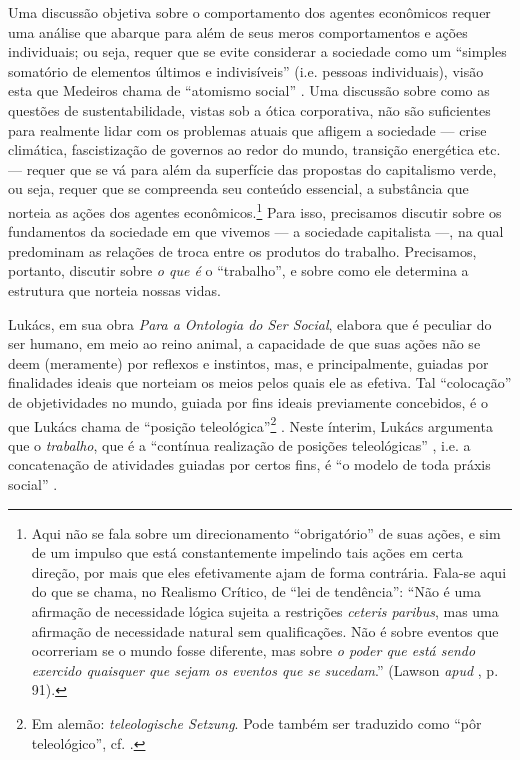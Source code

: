 \documentclass[12pt]{article}
\numberwithin{equation}{section}
\theoremstyle{plain}
\theoremstyle{definition}
\theoremstyle{remark}
\begin{document}
Uma discussão objetiva sobre o comportamento dos agentes econômicos requer uma análise que abarque para além de seus meros comportamentos e ações individuais; ou seja, requer que se evite considerar a sociedade como um ``simples somatório de elementos últimos e indivisíveis'' (i.e. pessoas individuais), visão esta que Medeiros chama de ``atomismo social'' \parencite[p. 56]{Medeiros2013}. Uma discussão sobre como as questões de sustentabilidade, vistas sob a ótica corporativa, não são suficientes para realmente lidar com os problemas atuais que afligem a sociedade --- crise climática, fascistização de governos ao redor do mundo, transição energética etc. --- requer que se vá para além da superfície das propostas do capitalismo verde, ou seja, requer que se compreenda seu conteúdo essencial, a substância que norteia as ações dos agentes econômicos.\footnote{Aqui não se fala sobre um direcionamento ``obrigatório'' de suas ações, e sim de um impulso que está constantemente impelindo tais ações em certa direção, por mais que eles efetivamente ajam de forma contrária. Fala-se aqui do que se chama, no Realismo Crítico, de ``lei de tendência'': ``Não é uma afirmação de necessidade lógica sujeita a restrições \textit{ceteris paribus}, mas uma afirmação de necessidade natural sem qualificações. Não é sobre eventos que  ocorreriam se o mundo fosse diferente, mas sobre \textit{o poder que está sendo exercido quaisquer que sejam os eventos que se sucedam}.'' (Lawson \textit{apud} \textcite*{Medeiros2013}, p. 91).} Para isso, precisamos discutir sobre os fundamentos da sociedade em que vivemos --- a sociedade capitalista ---, na qual predominam as relações de troca entre os produtos do trabalho. Precisamos, portanto, discutir sobre \textit{o que é} o ``trabalho'', e sobre como ele determina a estrutura que norteia nossas vidas.

Lukács, em sua obra \textit{Para a Ontologia do Ser Social}, elabora que é peculiar do ser humano, em meio ao reino animal, a capacidade de que suas ações não se deem (meramente) por reflexos e instintos, mas, e principalmente, guiadas por finalidades ideais que norteiam os meios pelos quais ele as efetiva. Tal ``colocação'' de objetividades no mundo, guiada por fins ideais previamente concebidos, é o que Lukács chama de ``posição teleológica''\footnote{Em alemão: \textit{teleologische Setzung}. Pode também ser traduzido como ``pôr teleológico'', cf. \textcite{Lukacs2013}.} \parencite{Lukacs2018}. Neste ínterim, Lukács argumenta que o \textit{trabalho}, que é a ``contínua realização de posições teleológicas'' \parencite[p. 17]{Lukacs2018}, i.e. a concatenação de atividades guiadas por certos fins, é ``o modelo de toda práxis social'' \parencite[p. 12]{Lukacs2018}. %
\end{document}
